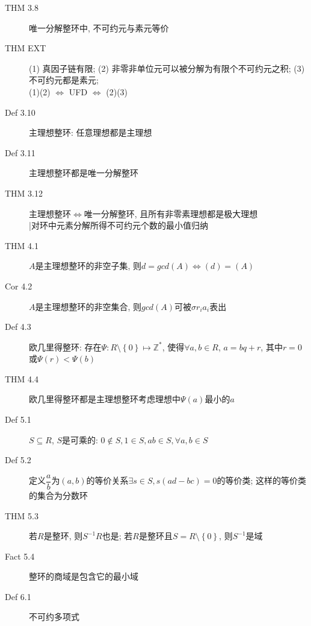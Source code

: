 \documentclass{article}
\renewcommand{\l}{\left}
\renewcommand{\r}{\right}
\begin{document}
\begin{description}
        \item[THM 3.8] 唯一分解整环中, 不可约元与素元等价
        \item[THM EXT] (1) 真因子链有限; (2) 非零非单位元可以被分解为有限个不可约元之积; (3) 不可约元都是素元;\\
            (1)(2) $\iff$ UFD $\iff$ (2)(3)
        \item[Def 3.10] 主理想整环: 任意理想都是主理想
        \item[Def 3.11] 主理想整环都是唯一分解整环
        \item[THM 3.12] 主理想整环$\iff$唯一分解整环, 且所有非零素理想都是极大理想\\
            |\hfill 对环中元素分解所得不可约元个数的最小值归纳
        \item[THM 4.1] $A$是主理想整环的非空子集, 则$d = gcd(A) \iff (d) = (A)$
        \item[Cor 4.2] $A$是主理想整环的非空集合, 则$gcd(A)$可被$\sigma r_ia_i$表出
        \item[Def 4.3] 欧几里得整环: 存在$\Psi : R\setminus\l\{0\r\} \mapsto \mathbb Z^\ast$, 使得$\forall a, b \in R$, $a = bq + r$, 其中$r = 0$或$\Psi(r) < \Psi(b)$
        \item[THM 4.4] 欧几里得整环都是主理想整环\hfill 考虑理想中$\Psi(a)$最小的$a$
        \item[Def 5.1] $S \subseteq R$, $S$是可乘的: $0 \notin S, 1\in S, ab \in S, \forall a, b \in S$
        \item[Def 5.2] 定义$\dfrac{a}{b}$为$(a, b)$的等价关系$\exists s \in S, s(ad-bc)=0$的等价类; 这样的等价类的集合为分数环
        \item[THM 5.3] 若$R$是整环, 则$S^{-1}R$也是; 若$R$是整环且$S=R\setminus\l\{0\r\}$, 则$S^{-1}$是域
        \item[Fact 5.4] 整环的商域是包含它的最小域
        \item[Def 6.1] 不可约多项式
    \end{description}
\end{document}
